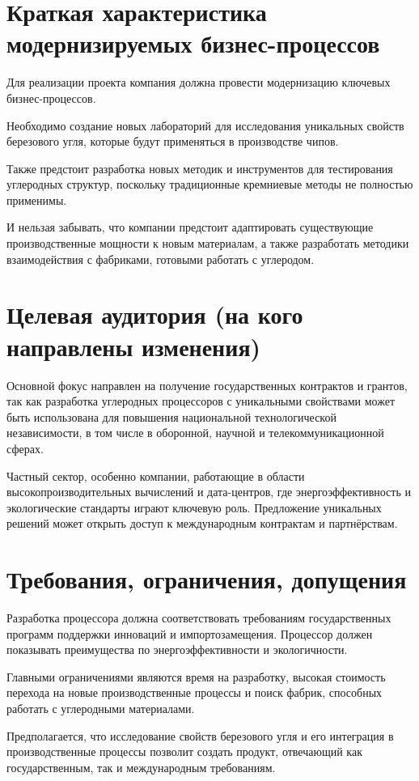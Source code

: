 \section{Краткая характеристика модернизируемых бизнес-процессов}

Для реализации проекта компания должна провести модернизацию
ключевых бизнес-процессов.\par
Необходимо создание новых лабораторий для исследования уникальных свойств
березового угля, которые будут применяться в производстве чипов.\par
Также предстоит разработка новых методик и инструментов
для тестирования углеродных структур,
поскольку традиционные кремниевые методы не полностью применимы.\par
И нельзая забывать, что компании предстоит адаптировать существующие
производственные мощности к новым материалам,
а также разработать методики взаимодействия с фабриками,
готовыми работать с углеродом.

\section{Целевая аудитория (на кого направлены изменения)}

Основной фокус направлен на получение государственных контрактов и грантов,
так как разработка углеродных процессоров с уникальными свойствами может быть
использована для повышения национальной технологической независимости,
в том числе в оборонной, научной и телекоммуникационной сферах.\par
Частный сектор, особенно компании, работающие
в области высокопроизводительных вычислений и дата-центров,
где энергоэффективность и экологические стандарты играют ключевую роль.
Предложение уникальных решений может открыть доступ
к международным контрактам и партнёрствам.

\section{Требования, ограничения, допущения}

Разработка процессора должна соответствовать требованиям государственных
программ поддержки инноваций и импортозамещения.
Процессор должен показывать преимущества
по энергоэффективности и экологичности.\par
Главными ограничениями являются время на разработку,
высокая стоимость перехода на новые производственные процессы
и поиск фабрик, способных работать с углеродными материалами.\par
Предполагается, что исследование свойств березового угля
и его интеграция в производственные процессы позволит создать продукт,
отвечающий как государственным, так и международным требованиям.\par

